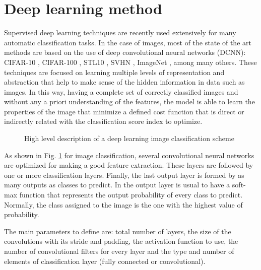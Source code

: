 \section{Deep learning method}\label{loss:dl}

Supervised deep learning techniques are recently used extensively for many automatic classification tasks. In the case of images, most of the state of the art methods are based on the use of deep convolutional neural networks (DCNN): CIFAR-10 \citep{DBLP:journals/corr/Graham14a}, CIFAR-100 \citep{DBLP:journals/corr/ClevertUH15}, STL10 \citep{DBLP:journals/corr/DundarJC15}, SVHN \citep{DBLP:journals/corr/LiaoC15a}, ImageNet \citep{NIPS2012_4824}, among many others. These techniques are focused on learning multiple levels of representation and abstraction that help to make sense of the hidden information in data such as images. In this way, having a complete set of correctly classified images and without any a priori understanding of the features, the model is able to learn the properties of the image that minimize a defined cost function that is direct or indirectly related with the classification score index to optimize. 

\begin{figure}[!h]
	\centering
	\caption{High level description of a deep learning image classification scheme}
	\label{loss:fig:classification}
\end{figure}


As shown in Fig. \ref{loss:fig:classification} for image classification, several convolutional neural networks are optimized for making  a good feature extraction. These layers are followed by one or more classification layers. Finally, the last output layer is formed by as many outputs as classes to predict. In the output layer is usual to have a soft-max function that represents the output probability of every class to predict. Normally, the class assigned to the image is the one with the highest value of probability. 

The main parameters to define are: total number of layers, the size of the convolutions with its stride and padding, the activation function to use, the number of convolutional filters for every layer and the type and number of elements of classification layer (fully connected or convolutional).

